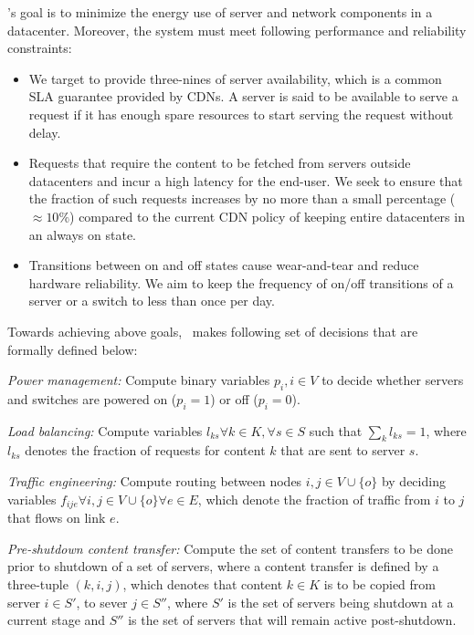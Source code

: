 \shrink's goal is to minimize the energy use of server and network components in a datacenter. Moreover, the system must meet following performance and reliability constraints: 
\begin{itemize}
\item
We target to provide three-nines of server availability, which is a common SLA guarantee provided by CDNs. A server is said to be available to serve a request if it has enough spare resources to start serving the request without delay.
\item
Requests that require the content to be fetched from servers outside datacenters and incur a high latency for the end-user. We seek to ensure that  the fraction of such requests increases by no more than a small percentage ($\approx 10\%$) compared to the current CDN policy of keeping entire datacenters in an always on state.
\item
Transitions between on and off states cause wear-and-tear and reduce hardware reliability. We aim to keep the frequency of on/off transitions of a server or a switch to less than once per day.
\end{itemize}


Towards achieving above goals, \shrink\ makes following set of decisions that are formally defined below:

\emph{Power management:} Compute binary variables $p_i, i \in V$ to decide whether servers and switches are powered on  ($p_i = 1$) or off ($p_i = 0$).

\emph{Load balancing:} Compute variables  $l_{ks} \forall k \in K, \forall  s \in S$ such that $\sum_k l_{ks} = 1$, where $l_{ks}$ denotes the fraction of requests for content $k$ that are sent to server $s$.

\emph{Traffic engineering:} Compute routing between nodes $i,j \in V \cup \{o\}$ by deciding variables  $f_{ije} \forall i,j \in V \cup \{o\} \forall e\in E$, which denote the fraction of traffic from $i$ to $j$ that flows on link $e$.

\emph{Pre-shutdown content transfer:} Compute the set of content transfers to be done prior to shutdown of a set of servers, where a content transfer is defined by a three-tuple $(k, i, j)$, which denotes that content $k \in K$ is to be copied from server $i \in S'$, to sever $j \in S''$, where $S'$ is the set of servers being shutdown at a current stage  and $S''$  is the set of servers that will remain active post-shutdown. 

